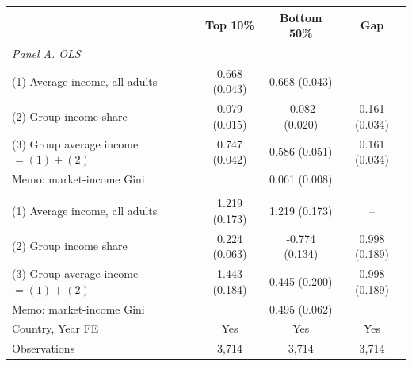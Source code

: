 \begin{tabular}{lccc}
\toprule
 & Top 10\% & Bottom 50\% & Gap \\
\midrule
\multicolumn{4}{l}{\emph{Panel A. OLS}}\\
(1) Average income, all adults & 0.668\sym{***} (0.043) & 0.668\sym{***} (0.043) & -- \\
(2) Group income share & 0.079\sym{***} (0.015) & -0.082\sym{***} (0.020) & 0.161\sym{***} (0.034) \\
(3) Group average income $=(1)+(2)$ & 0.747\sym{***} (0.042) & 0.586\sym{***} (0.051) & 0.161\sym{***} (0.034) \\
Memo: market-income Gini & \multicolumn{3}{c}{0.061\sym{***} (0.008)} \\
\addlinespace
\multicolumn{4}{l}{\emph{Panel B. 2SLS, Feyrer instrument}}\\
(1) Average income, all adults & 1.219\sym{***} (0.173) & 1.219\sym{***} (0.173) & -- \\
(2) Group income share & 0.224\sym{***} (0.063) & -0.774\sym{***} (0.134) & 0.998\sym{***} (0.189) \\
(3) Group average income $=(1)+(2)$ & 1.443\sym{***} (0.184) & 0.445\sym{**} (0.200) & 0.998\sym{***} (0.189) \\
Memo: market-income Gini & \multicolumn{3}{c}{0.495\sym{***} (0.062)} \\
\addlinespace
\midrule
Country, Year FE & Yes & Yes & Yes \\
Observations & 3,714 & 3,714 & 3,714 \\
\bottomrule
\end{tabular}
